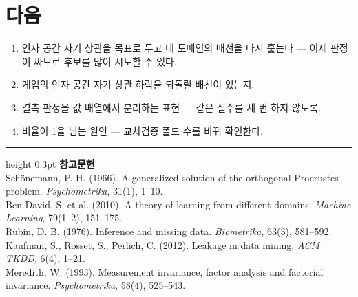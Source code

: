 \documentclass[10pt]{article}
\begin{document}
\section{다음}

\begin{enumerate}[leftmargin=1.3em,itemsep=0.15em]
\item 인자 공간 자기 상관을 목표로 두고 네 도메인의 배선을 다시 훑는다 ---
      이제 판정이 싸므로 후보를 많이 시도할 수 있다.
\item 게임의 인자 공간 자기 상관 하락을 되돌릴 배선이 있는지.
\item 결측 판정을 값 배열에서 분리하는 표현 --- 같은 실수를 세 번 하지 않도록.
\item 비율이 1을 넘는 원인 --- 교차검증 폴드 수를 바꿔 확인한다.
\end{enumerate}

\vspace{0.6em}
\hrule height 0.3pt
\vspace{0.5em}
{\footnotesize
\textbf{참고문헌}\\[0.3em]
Schönemann, P. H. (1966). A generalized solution of the orthogonal Procrustes
problem. \emph{Psychometrika}, 31(1), 1--10.\\[0.15em]
Ben-David, S. et al. (2010). A theory of learning from different domains.
\emph{Machine Learning}, 79(1--2), 151--175.\\[0.15em]
Rubin, D. B. (1976). Inference and missing data. \emph{Biometrika}, 63(3), 581--592.\\[0.15em]
Kaufman, S., Rosset, S., Perlich, C. (2012). Leakage in data mining.
\emph{ACM TKDD}, 6(4), 1--21.\\[0.15em]
Meredith, W. (1993). Measurement invariance, factor analysis and factorial
invariance. \emph{Psychometrika}, 58(4), 525--543.
}
\end{document}
